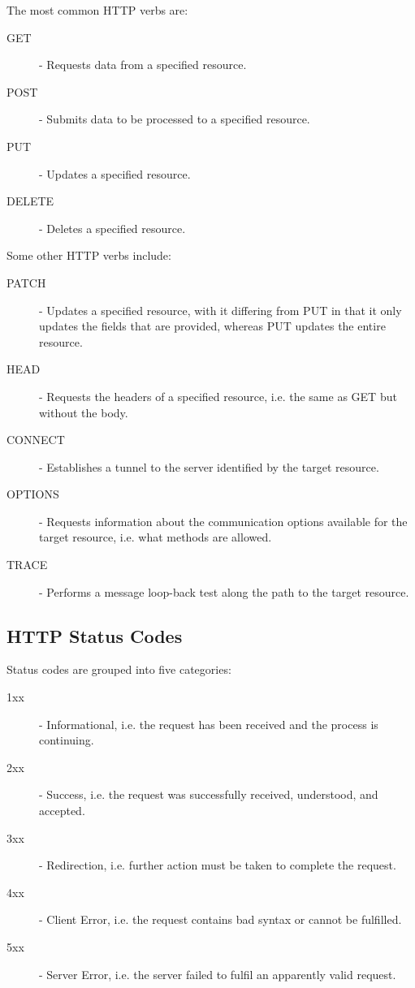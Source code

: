 \documentclass[12pt letter]{report}
\begin{document}
The most common HTTP verbs are:
\begin{description}
  \item[GET] - Requests data from a specified resource.
  \item[POST] - Submits data to be processed to a specified resource.
  \item[PUT] - Updates a specified resource.
  \item[DELETE] - Deletes a specified resource.
\end{description}
Some other HTTP verbs include:
\begin{description}
  \item[PATCH] - Updates a specified resource, with it differing from PUT in that it only updates the fields that are
        provided, whereas PUT updates the entire resource.
  \item[HEAD] - Requests the headers of a specified resource, i.e. the same as GET but without the body.
  \item[CONNECT] - Establishes a tunnel to the server identified by the target resource.
  \item[OPTIONS] - Requests information about the communication options available for the target resource, i.e. what methods
        are allowed.
  \item [TRACE] - Performs a message loop-back test along the path to the target resource.
\end{description}

\subsection{HTTP Status Codes}


Status codes are grouped into five categories:
\begin{description}
  \item[1xx] - Informational, i.e. the request has been received and the process is continuing.
  \item[2xx] - Success, i.e. the request was successfully received, understood, and accepted.
  \item[3xx] - Redirection, i.e. further action must be taken to complete the request.
  \item[4xx] - Client Error, i.e. the request contains bad syntax or cannot be fulfilled.
  \item[5xx] - Server Error, i.e. the server failed to fulfil an apparently valid request.
\end{description}
\end{document}
